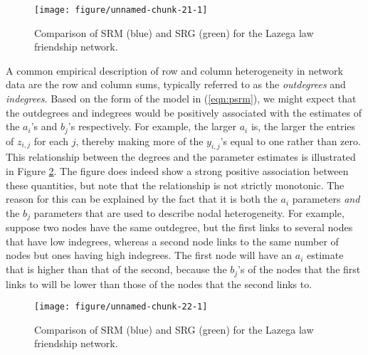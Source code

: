 \documentclass[11pt]{article}\usepackage[]{graphicx}\usepackage[]{color}
\makeatletter
\def\maxwidth{ %
  \ifdim\Gin@nat@width>\linewidth
    \linewidth
  \else
    \Gin@nat@width
  \fi
}
\newenvironment{knitrout}{}{} %
\makeatother
\begin{document}
\begin{figure}
\begin{knitrout}\footnotesize
{}\color{fgcolor}

{\centering \texttt{[image: figure/unnamed-chunk-21-1]} 

}



\end{knitrout}
\caption{Comparison of SRM (blue) and SRG (green) for the 
Lazega law friendship network.} 
\label{fig:ll_fcomp}
\end{figure}

A common empirical description of row and column heterogeneity 
in network data are 
the row and column sums, typically referred to as the 
\emph{outdegrees} and \emph{indegrees}. 
Based on the form of the model in (\ref{eqn:psrm}),
we might expect that the outdegrees and indegrees would be positively 
associated with the estimates of the $a_i$'s and $b_j$'s 
respectively. For example, the larger $a_i$ is, the larger the 
entries of $z_{i,j}$ for each $j$, thereby making more of the 
$y_{i,j}$'s equal to one rather than zero. 
This relationship between the degrees and the parameter estimates 
is illustrated in Figure 
\ref{fig:ll_degrees}. 
The figure does indeed show a strong positive association between these 
quantities, but note that the relationship is not 
strictly monotonic. The reason for this can be explained
by the fact that it is both the $a_i$ parameters \emph{and} 
the $b_j$ parameters that are used to describe nodal heterogeneity. 
For example, 
suppose two nodes have the same outdegree, but the 
first links to several nodes that have low indegrees, 
whereas a second node links to the same number of 
nodes but ones having high indegrees. 
The first node will have an $a_i$ estimate that is 
higher than that of the second, because the $b_j$'s 
of the nodes that the first links to will be lower 
than those of the nodes that the second links to. 


\begin{figure}
\begin{knitrout}\footnotesize
{}\color{fgcolor}

{\centering \texttt{[image: figure/unnamed-chunk-22-1]} 

}



\end{knitrout}
\caption{Comparison of SRM (blue) and SRG (green) for the
Lazega law friendship network.}
\label{fig:ll_degrees}
\end{figure}
\end{document}
